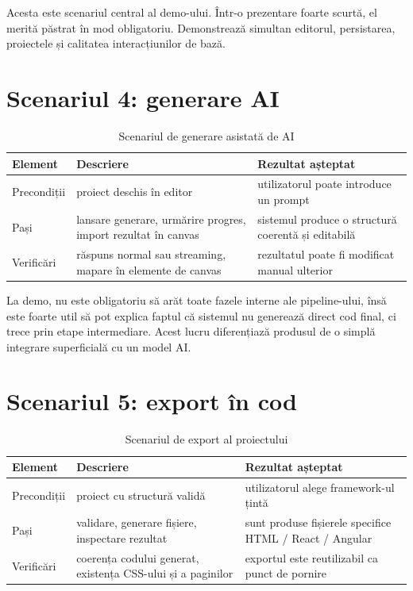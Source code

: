 Acesta este scenariul central al demo-ului. Într-o prezentare foarte scurtă, el merită păstrat în mod obligatoriu. Demonstrează simultan editorul, persistarea, proiectele și calitatea interacțiunilor de bază.

\section{Scenariul 4: generare AI}

\begin{table}[!htbp]
  \centering
  \caption{Scenariul de generare asistată de AI}
  \renewcommand{\arraystretch}{1.15}
  \begin{tabularx}{\textwidth}{>{\RaggedRight\arraybackslash}p{3.2cm}YY}
    \toprule
    \textbf{Element} & \textbf{Descriere} & \textbf{Rezultat așteptat} \\
    \midrule
    Precondiții & proiect deschis în editor & utilizatorul poate introduce un prompt \\
    Pași & lansare generare, urmărire progres, import rezultat în canvas & sistemul produce o structură coerentă și editabilă \\
    Verificări & răspuns normal sau streaming, mapare în elemente de canvas & rezultatul poate fi modificat manual ulterior \\
    \bottomrule
  \end{tabularx}
\end{table}

La demo, nu este obligatoriu să arăt toate fazele interne ale pipeline-ului, însă este foarte util să pot explica faptul că sistemul nu generează direct cod final, ci trece prin etape intermediare. Acest lucru diferențiază produsul de o simplă integrare superficială cu un model AI.

\section{Scenariul 5: export în cod}

\begin{table}[!htbp]
  \centering
  \caption{Scenariul de export al proiectului}
  \renewcommand{\arraystretch}{1.15}
  \begin{tabularx}{\textwidth}{>{\RaggedRight\arraybackslash}p{3.2cm}YY}
    \toprule
    \textbf{Element} & \textbf{Descriere} & \textbf{Rezultat așteptat} \\
    \midrule
    Precondiții & proiect cu structură validă & utilizatorul alege framework-ul țintă \\
    Pași & validare, generare fișiere, inspectare rezultat & sunt produse fișierele specifice HTML / React / Angular \\
    Verificări & coerența codului generat, existența CSS-ului și a paginilor & exportul este reutilizabil ca punct de pornire \\
    \bottomrule
  \end{tabularx}
\end{table}

